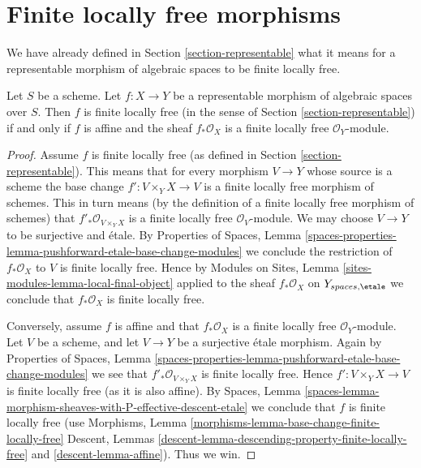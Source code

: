 \section{Finite locally free morphisms}
\label{section-finite-locally-free}

\noindent
We have already defined in Section \ref{section-representable}
what it means for a representable morphism of algebraic spaces
to be finite locally free.

\begin{lemma}
\label{lemma-finite-locally-free-representable}
Let $S$ be a scheme. Let $f : X \to Y$ be a representable morphism
of algebraic spaces over $S$. Then $f$ is finite locally free
(in the sense of Section \ref{section-representable})
if and only if $f$ is affine and the sheaf $f_*\mathcal{O}_X$ is
a finite locally free $\mathcal{O}_Y$-module.
\end{lemma}

\begin{proof}
Assume $f$ is finite locally free (as defined in
Section \ref{section-representable}). This means that
for every morphism $V \to Y$ whose source is a scheme the
base change $f' : V \times_Y X \to V$ is a finite locally free morphism
of schemes. This in turn means (by the definition of a finite locally
free morphism of schemes) that
$f'_*\mathcal{O}_{V \times_Y X}$
is a finite locally free $\mathcal{O}_V$-module. We may choose $V \to Y$
to be surjective and \'etale. By
Properties of Spaces,
Lemma \ref{spaces-properties-lemma-pushforward-etale-base-change-modules}
we conclude the restriction of $f_*\mathcal{O}_X$ to $V$ is
finite locally free. Hence by
Modules on Sites, Lemma \ref{sites-modules-lemma-local-final-object}
applied to the sheaf $f_*\mathcal{O}_X$ on $Y_{spaces, \etale}$
we conclude that $f_*\mathcal{O}_X$ is finite locally free.

\medskip\noindent
Conversely, assume $f$ is affine and that $f_*\mathcal{O}_X$ is a finite
locally free $\mathcal{O}_Y$-module. Let $V$ be a scheme, and let
$V \to Y$ be a surjective \'etale morphism. Again by
Properties of Spaces,
Lemma \ref{spaces-properties-lemma-pushforward-etale-base-change-modules}
we see that $f'_*\mathcal{O}_{V \times_Y X}$ is finite locally free.
Hence $f' : V \times_Y X \to V$ is finite locally free (as it is also affine).
By
Spaces,
Lemma \ref{spaces-lemma-morphism-sheaves-with-P-effective-descent-etale}
we conclude that $f$ is finite locally free (use
Morphisms, Lemma \ref{morphisms-lemma-base-change-finite-locally-free}
Descent, Lemmas \ref{descent-lemma-descending-property-finite-locally-free}
and \ref{descent-lemma-affine}). Thus we win.
\end{proof}

